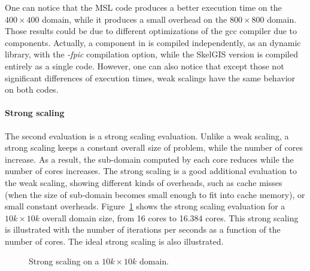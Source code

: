 One can notice that the MSL code produces a better execution time on the $400 \times 400$ domain, while it produces a small overhead on the $800 \times 800$ domain. Those results could be due to different optimizations of the gcc compiler due to components. Actually, a component in \llc is compiled independently, as an dynamic library, with the \emph{-fpic} compilation option, while the SkelGIS version is compiled entirely as a single code. However, one can also notice that except those not significant differences of execution times, weak scalings have the same behavior on both codes.

\paragraph{\textbf{Strong scaling}} The second evaluation is a strong scaling evaluation. Unlike a weak scaling, a strong scaling keeps a constant overall size of problem, while the number of cores increase. As a result, the sub-domain computed by each core reduces while the number of cores increases. The strong scaling is a good additional evaluation to the weak scaling, showing different kinds of overheads, such as cache misses (when the size of sub-domain becomes small enough to fit into cache memory), or small constant overheads. Figure~\ref{fig:strong} shows the strong scaling evaluation for a $10k \times 10k$ overall domain size, from 16 cores to 16.384 cores. This strong scaling is illustrated with the number of iterations per seconds as a function of the number of cores. The ideal strong scaling is also illustrated.

\begin{figure}[!h]\begin{center}
  \caption{Strong scaling on a $10k \times 10k$ domain.}
  \label{fig:strong}
\end{center}\end{figure}

